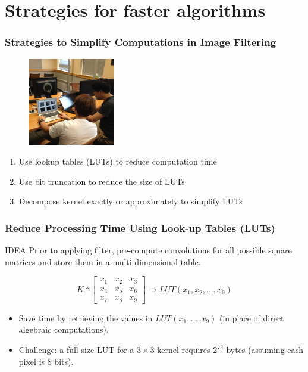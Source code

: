 \documentclass{beamer}
\begin{document}
\section{Strategies for faster algorithms}

\begin{frame}
\frametitle{Strategies to Simplify Computations in Image Filtering}
\begin{figure}[htb]
  \begin{center}
  \includegraphics[height=1.5in]{FOCUS.JPG}
  
  \end{center}
  \end{figure}
\begin{enumerate}
\item Use lookup tables (LUTs) to reduce computation time
\pause\item Use bit truncation to reduce the size of LUTs
\pause\item Decompose kernel exactly or approximately to simplify LUTs
\end{enumerate}
\end{frame}

\begin{frame}
\frametitle{Reduce Processing Time Using Look-up Tables (LUTs)}
\begin{beamerboxesrounded}[lower=eeks2,upper=eecks,
shadow=true]{IDEA}
Prior to applying filter,
pre-compute convolutions for all possible square matrices and 
store them in a multi-dimensional table.
\end{beamerboxesrounded}

$$
K * \begin{bmatrix}
x_1 & x_2 & x_3\\
x_4 & x_5 & x_6\\
x_7 & x_8 & x_9
\end{bmatrix}
 \rightarrow LUT(x_1,x_2,\dots,x_9)
$$

\begin{itemize}
\item Save time by retrieving the values in $LUT(x_1,\dots,x_9)$ (in place of direct algebraic computations).
\item Challenge: a full-size LUT for a $3 \times 3$ kernel requires $2^{72}$ bytes (assuming each pixel is 8 bits).
\end{itemize}
\end{frame}
\end{document}
